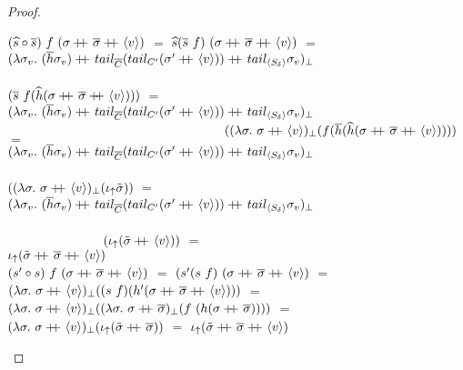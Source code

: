 \begin{proof}
\begin{itemize}
\begin{itemize}
\begin{itemize}
$(\widehat{s} \circ \overline{s}) \ f \ (\sigma +\kern-1.3ex+\kern0.8ex \overline{\sigma} +\kern-1.3ex+\kern0.8ex \langle v \rangle)$ $=$
$\widehat{s} (\overline{s} \ f) \ (\sigma +\kern-1.3ex+\kern0.8ex \overline{\sigma} +\kern-1.3ex+\kern0.8ex \langle v \rangle)$ $=$\\
$(\lambda \sigma_{v} . \
				(\overline{h} \sigma_{v}) +\kern-1.3ex+\kern0.8ex 
				tail_{\overline{C}}(tail_{C'}(\sigma' +\kern-1.3ex+\kern0.8ex \langle v \rangle)) +\kern-1.3ex+\kern0.8ex
				tail_{\langle S_\delta \rangle}\sigma_{v})_{\bot}$\\
\indent \ \ \ \ \ \ \ \ \ \ \ \ \ \ \ \ \ \ \ \ \ \ \ \ \ \ \ \ \ \ \ \ \ \ \ \ \ \ \ \ \ \ \ \
 \ \ \ \ \ \ \ \ \ \ \ \ \ \ \ \ \ \ \ \ \ \ \ \ \ \ \ \
$(\overline{s} \ f (\widehat{h} (\sigma +\kern-1.3ex+\kern0.8ex \overline{\sigma} +\kern-1.3ex+\kern0.8ex \langle v \rangle)))$ $=$\\
$(\lambda \sigma_{v} . \
				(\overline{h} \sigma_{v}) +\kern-1.3ex+\kern0.8ex 
				tail_{\overline{C}}(tail_{C'}(\sigma' +\kern-1.3ex+\kern0.8ex \langle v \rangle)) +\kern-1.3ex+\kern0.8ex
				tail_{\langle S_\delta \rangle}\sigma_{v})_{\bot}$\\
\indent \ \ \ \ \ \ \ \ \ \ \ \ \ \ \  \ \ \ \ \ \ \ \ \ \ \ \ \ \ \ \ \ \ \
$((\lambda \sigma . \ \sigma +\kern-1.3ex+\kern0.8ex \langle v \rangle)_{\bot} 
	(f (\overline{h} (\widehat{h} (\sigma +\kern-1.3ex+\kern0.8ex \overline{\sigma} +\kern-1.3ex+\kern0.8ex \langle v \rangle))))$ $=$\\
$(\lambda \sigma_{v} . \
				(\overline{h} \sigma_{v}) +\kern-1.3ex+\kern0.8ex 
				tail_{\overline{C}}(tail_{C'}(\sigma' +\kern-1.3ex+\kern0.8ex \langle v \rangle)) +\kern-1.3ex+\kern0.8ex
				tail_{\langle S_\delta \rangle}\sigma_{v})_{\bot}$\\
\indent \ \ \ \ \ \ \ \ \ \ \ \ \ \ \  \ \ \ \ \ \ \ \ \ \ \ \ \ \ \ \ \ \ \
 \ \ \ \ \ \ \ \ \ \ \ \ \ \ \ \ \ \ \ \ \ \ \ \ \ \ \ \  \ \ \ \ \ \ \ \
$((\lambda \sigma . \ \sigma +\kern-1.3ex+\kern0.8ex \langle v \rangle)_{\bot} (\iota_{\uparrow} \tilde{\sigma}))$ $=$\\
$(\lambda \sigma_{v} . \
				(\overline{h} \sigma_{v}) +\kern-1.3ex+\kern0.8ex 
				tail_{\overline{C}}(tail_{C'}(\sigma' +\kern-1.3ex+\kern0.8ex \langle v \rangle)) +\kern-1.3ex+\kern0.8ex
				tail_{\langle S_\delta \rangle}\sigma_{v})_{\bot}$\\
\indent \ \ \ \ \ \ \ \ \ \ \ \ \ \ \  \ \ \ \ \ \ \ \ \ \ \ \ \ \ \ \ \ \ \
 \ \ \ \ \ \ \ \ \ \ \ \ \ \ \ \ \ \ \ \ \ \ \ \ \ \ \ \  \ \ \ \ \ \ \ \  \ \ \ \
  \ \ \ \ \ \ \ \ \ \ \ \ \
$(\iota_{\uparrow} (\tilde{\sigma} +\kern-1.3ex+\kern0.8ex \langle v \rangle))$ $=$\\
$\iota_{\uparrow} (\tilde{\sigma} +\kern-1.3ex+\kern0.8ex \overline{\sigma} +\kern-1.3ex+\kern0.8ex \langle v \rangle)$\\

$(s' \circ s) \ f \ (\sigma +\kern-1.3ex+\kern0.8ex \overline{\sigma} +\kern-1.3ex+\kern0.8ex \langle v \rangle)$ $=$
$(s' (s \ f) \ (\sigma +\kern-1.3ex+\kern0.8ex \overline{\sigma} +\kern-1.3ex+\kern0.8ex \langle v \rangle)$ $=$\\
$(\lambda \sigma . \ \sigma +\kern-1.3ex+\kern0.8ex \langle v \rangle)_{\bot} 
		((s \ f) (h'(\sigma +\kern-1.3ex+\kern0.8ex \overline{\sigma} +\kern-1.3ex+\kern0.8ex \langle v \rangle)))$ $=$\\
$(\lambda \sigma . \ \sigma +\kern-1.3ex+\kern0.8ex \langle v \rangle)_{\bot}
((\lambda \sigma . \ \sigma +\kern-1.3ex+\kern0.8ex \overline{\sigma})_{\bot} (f \ (h (\sigma +\kern-1.3ex+\kern0.8ex \overline{\sigma}))))$ $=$\\
$(\lambda \sigma . \ \sigma +\kern-1.3ex+\kern0.8ex \langle v \rangle)_{\bot} 
		(\iota_{\uparrow} (\tilde{\sigma} +\kern-1.3ex+\kern0.8ex \overline{\sigma}))$ $=$
$\iota_{\uparrow} (\tilde{\sigma} +\kern-1.3ex+\kern0.8ex \overline{\sigma} +\kern-1.3ex+\kern0.8ex \langle v \rangle)$\\


\end{itemize}
\end{itemize}
\end{itemize}
\end{proof}
